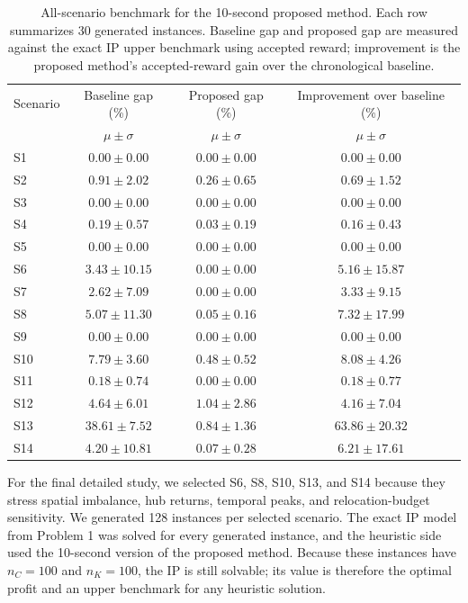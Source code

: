 \documentclass[10pt,a4paper]{article}
\begin{document}
\begin{table}[ht]
\centering
\small
\setlength{\tabcolsep}{5pt}
\begin{tabular}{lccc}
\toprule
Scenario & Baseline gap (\%) & Proposed gap (\%) & Improvement over baseline (\%)\\
& $\mu \pm \sigma$ & $\mu \pm \sigma$ & $\mu \pm \sigma$\\
\midrule
S1  & $0.00 \pm 0.00$ & $0.00 \pm 0.00$ & $0.00 \pm 0.00$\\
S2  & $0.91 \pm 2.02$ & $0.26 \pm 0.65$ & $0.69 \pm 1.52$\\
S3  & $0.00 \pm 0.00$ & $0.00 \pm 0.00$ & $0.00 \pm 0.00$\\
S4  & $0.19 \pm 0.57$ & $0.03 \pm 0.19$ & $0.16 \pm 0.43$\\
S5  & $0.00 \pm 0.00$ & $0.00 \pm 0.00$ & $0.00 \pm 0.00$\\
S6  & $3.43 \pm 10.15$ & $0.00 \pm 0.00$ & $5.16 \pm 15.87$\\
S7  & $2.62 \pm 7.09$ & $0.00 \pm 0.00$ & $3.33 \pm 9.15$\\
S8  & $5.07 \pm 11.30$ & $0.05 \pm 0.16$ & $7.32 \pm 17.99$\\
S9  & $0.00 \pm 0.00$ & $0.00 \pm 0.00$ & $0.00 \pm 0.00$\\
S10 & $7.79 \pm 3.60$ & $0.48 \pm 0.52$ & $8.08 \pm 4.26$\\
S11 & $0.18 \pm 0.74$ & $0.00 \pm 0.00$ & $0.18 \pm 0.77$\\
S12 & $4.64 \pm 6.01$ & $1.04 \pm 2.86$ & $4.16 \pm 7.04$\\
S13 & $38.61 \pm 7.52$ & $0.84 \pm 1.36$ & $63.86 \pm 20.32$\\
S14 & $4.20 \pm 10.81$ & $0.07 \pm 0.28$ & $6.21 \pm 17.61$\\
\bottomrule
\end{tabular}
\caption{All-scenario benchmark for the 10-second proposed method.
Each row summarizes 30 generated instances. Baseline gap and proposed gap
are measured against the exact IP upper benchmark using accepted reward;
improvement is the proposed method's accepted-reward gain over the
chronological baseline.}
\end{table}

For the final detailed study, we selected S6, S8, S10, S13, and S14 because they
stress spatial imbalance, hub returns, temporal peaks, and relocation-budget
sensitivity.  We generated 128 instances per selected scenario.  The exact IP
model from Problem 1 was solved for every generated instance, and the heuristic
side used the 10-second version of the proposed method.  Because these instances
have $n_C=100$ and $n_K=100$, the IP is still solvable; its value is therefore
the optimal profit and an upper benchmark for any heuristic solution.
\end{document}
